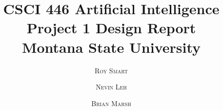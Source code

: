 \documentclass[twoside]{article}
\title{\vspace{-15mm}\fontsize{24pt}{10pt}\selectfont\textbf{CSCI 446 Artificial Intelligence \\ Project 1 Design Report} \\[4mm] \Large Montana State University} %
\date{}
\author{ 
\large
\textsc{Roy Smart} \and \textsc{Nevin Leh} \and \textsc{Brian Marsh} \\[2mm] %
}
\begin{document}
\maketitle %

\thispagestyle{fancy} %



\begin{multicols}{2} %


\end{multicols}
\end{document}
